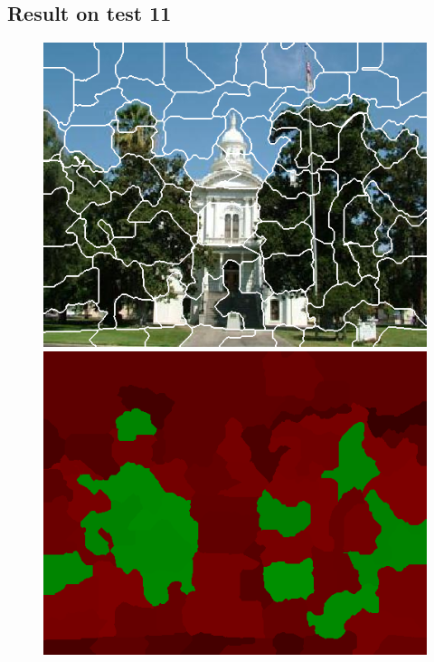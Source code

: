 \documentclass[a4paper,titlepaget]{article}
\begin{document}
\subsection{Result on test 11}
\begin{figure}[htpb] 
	\centering
	\begin{minipage}{.3\textwidth}
		\includegraphics[width=1.7\textwidth]{images/results/11seg} 
	\end{minipage}
	\hspace{.25\textwidth}
	\begin{minipage}{.3\textwidth}
		\includegraphics[width=1.7\textwidth]{images/results/11map}
	\end{minipage}  
\end{figure}
\end{document}
